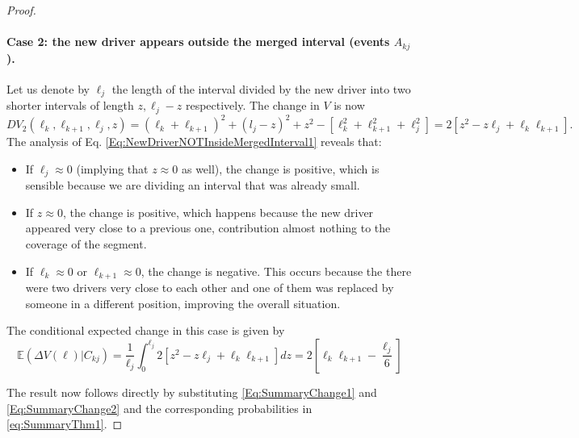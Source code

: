 \documentclass[12pt,english]{article}
\begin{document}
{\begin{proof}
\paragraph{Case 2: the new driver appears outside the merged interval (events $A_{kj}$).}
Let us denote by $\ell_j$ the length of the interval divided by the new driver into two shorter intervals of length $z, \ell_j-z$ respectively. The change in $V$ is now 
\begin{equation}\label{Eq:NewDriverNOTInsideMergedInterval1}
    DV_2(\ell_k,\ell_{k+1},\ell_j,z)=(\ell_k+\ell_{k+1})^2+(l_j-z)^2+z^2 - [\ell_k^2+\ell_{k+1}^2+\ell_j^2] = 2[z^2-z\ell_j+\ell_k\ell_{k+1}].
\end{equation}
The analysis of Eq. \eqref{Eq:NewDriverNOTInsideMergedInterval1} reveals that:
\begin{itemize}
    \item If $\ell_j \approx 0$ (implying that $z\approx 0$ as well), the change is positive, which is sensible because we are dividing an interval that was already small.
    \item If $z\approx 0$, the change is positive, which happens because the new driver appeared very close to a previous one, contribution almost nothing to the coverage of the segment.
    \item If $\ell_k \approx 0$ or $\ell_{k+1} \approx 0$, the change is negative. This occurs because the there were two drivers very close to each other and one of them was replaced by someone in a different position, improving the overall situation.
\end{itemize}
The conditional expected change in this case is given by 
\begin{equation}\label{Eq:SummaryChange2}
    \mathbb{E}(\Delta V(\ell)|C_{kj})=\frac{1}{\ell_j}\int_0^{\ell_j} 2[z^2-z\ell_j+\ell_k\ell_{k+1}] dz= 2\left[\ell_k\ell_{k+1}-\frac{\ell_j}{6} \right]
\end{equation}

\noindent The result now follows directly by substituting \eqref{Eq:SummaryChange1} and \eqref{Eq:SummaryChange2} and the corresponding probabilities in \eqref{eq:SummaryThm1}.
\end{proof}

}
\end{document}
